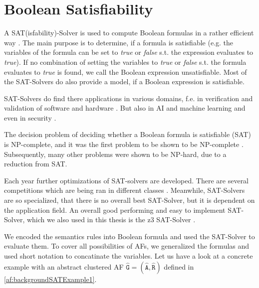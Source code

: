 \section{Boolean Satisfiability}
\label{sec:BooleanSatisfiability}

A SAT(isfability)-Solver is used to compute Boolean formulas in a rather efficient way \cite{Biere2009}. The main purpose is to determine, if a formula is satisfiable (e.g. the variables of the formula can be set to \textit{true} or \textit{false} s.t. the expression evaluates to \textit{true}). If no combination of setting the variables to \textit{true} or \textit{false} s.t. the formula evaluates to \textit{true} is found, we call the Boolean expression unsatisfiable. Most of the SAT-Solvers do also provide a model, if a Boolean expression is satisfiable.

SAT-Solvers do find there applications in various domains, f.e. in verification and validation of software and hardware \cite{DBLP:conf/dagstuhl/Gogolla09, DBLP:books/daglib/0045943}. But also in AI and machine learning \cite{DBLP:phd/basesearch/Liang18a} and even in security \cite{Pasero2022-SATHashFunctions-Repo, DBLP:journals/iacr/LinYXTS24}.

The decision problem of deciding whether a Boolean formula is satisfiable (SAT) is NP-complete, and it was the first problem to be shown to be NP-complete \cite{Cook71}. Subsequently, many other problems were shown to be NP-hard, due to a reduction from SAT.


Each year further optimizations of SAT-solvers are developed. There are several competitions which are being ran in different classes \cite{SAT-Solver-Competition}. Meanwhile, SAT-Solvers are so specialized, that there is no overall best SAT-Solver, but it is dependent on the application field. An overall good performing and easy to implement SAT-Solver, which we also used in this thesis is the z3 SAT-Solver \cite{z3-SAT-Solver}.


We encoded the semantics rules into Boolean formula and used the SAT-Solver to evaluate them. To cover all possibilities of AFs, we generalized the formulas and used short notation to concatinate the variables. Let us have a look at a concrete example with an abstract clustered AF $\mathtt{\hat{G}=(\hat{A}, \hat{R})}$ defined in \ref{af:backgroundSATExample1}.




